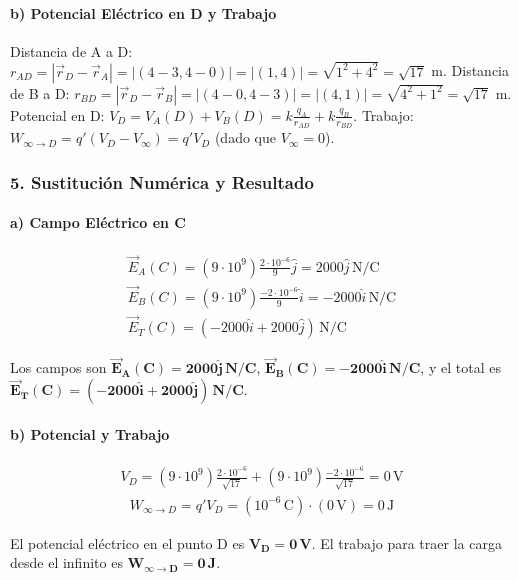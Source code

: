 \paragraph*{b) Potencial Eléctrico en D y Trabajo}
Distancia de A a D: $r_{AD} = |\vec{r}_D - \vec{r}_A| = |(4-3, 4-0)| = |(1,4)| = \sqrt{1^2+4^2} = \sqrt{17}$ m.
Distancia de B a D: $r_{BD} = |\vec{r}_D - \vec{r}_B| = |(4-0, 4-3)| = |(4,1)| = \sqrt{4^2+1^2} = \sqrt{17}$ m.
Potencial en D: $V_D = V_A(D) + V_B(D) = k \frac{q_A}{r_{AD}} + k \frac{q_B}{r_{BD}}$.
Trabajo: $W_{\infty \to D} = q'(V_D - V_\infty) = q' V_D$ (dado que $V_\infty = 0$).

\subsubsection*{5. Sustitución Numérica y Resultado}
\paragraph*{a) Campo Eléctrico en C}
\begin{gather}
    \vec{E}_A(C) = (9\cdot10^9) \frac{2\cdot10^{-6}}{9} \hat{j} = 2000 \hat{j} \, \text{N/C} \\
    \vec{E}_B(C) = (9\cdot10^9) \frac{-2\cdot10^{-6}}{9} \hat{i} = -2000 \hat{i} \, \text{N/C} \\
    \vec{E}_T(C) = (-2000 \hat{i} + 2000 \hat{j}) \, \text{N/C}
\end{gather}
\begin{cajaresultado}
    Los campos son $\boldsymbol{\vec{E}_A(C) = 2000 \hat{j} \, N/C}$, $\boldsymbol{\vec{E}_B(C) = -2000 \hat{i} \, N/C}$, y el total es $\boldsymbol{\vec{E}_T(C) = (-2000 \hat{i} + 2000 \hat{j}) \, N/C}$.
\end{cajaresultado}

\paragraph*{b) Potencial y Trabajo}
\begin{gather}
    V_D = (9\cdot10^9) \frac{2\cdot10^{-6}}{\sqrt{17}} + (9\cdot10^9) \frac{-2\cdot10^{-6}}{\sqrt{17}} = 0 \, \text{V}
\end{gather}
\begin{gather}
    W_{\infty \to D} = q' V_D = (10^{-6} \, \text{C}) \cdot (0 \, \text{V}) = 0 \, \text{J}
\end{gather}
\begin{cajaresultado}
    El potencial eléctrico en el punto D es $\boldsymbol{V_D = 0 \, V}$. El trabajo para traer la carga desde el infinito es $\boldsymbol{W_{\infty \to D} = 0 \, J}$.
\end{cajaresultado}

